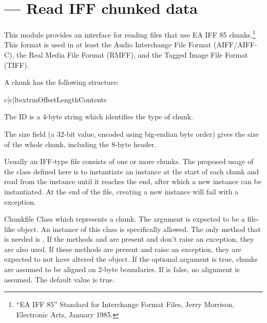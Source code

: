 \section{ ---
	 Read IFF chunked data}




This module provides an interface for reading files that use EA IFF 85
chunks.\footnote{``EA IFF 85'' Standard for Interchange Format Files,
Jerry Morrison, Electronic Arts, January 1985.}  This format is used
in at least the Audio Interchange File Format
(AIFF/AIFF-C), the Real Media File
Format (RMFF), and the
Tagged Image File Format
(TIFF).

A chunk has the following structure:

\begin{tableiii}{c|c|l}{textrm}{Offset}{Length}{Contents}
\end{tableiii}

The ID is a 4-byte string which identifies the type of chunk.

The size field (a 32-bit value, encoded using big-endian byte order)
gives the size of the whole chunk, including the 8-byte header.

Usually an IFF-type file consists of one or more chunks.  The proposed
usage of the  class defined here is to instantiate an
instance at the start of each chunk and read from the instance until
it reaches the end, after which a new instance can be instantiated.
At the end of the file, creating a new instance will fail with a
 exception.

\begin{classdesc}{Chunk}{file}
Class which represents a chunk.  The  argument is expected
to be a file-like object.  An instance of this class is specifically
allowed.  The only method that is needed is .  If the
methods  and  are present and don't
raise an exception, they are also used.  If these methods are present
and raise an exception, they are expected to not have altered the
object.  If the optional argument  is true, chunks are
assumed to be aligned on 2-byte boundaries.  If  is
false, no alignment is assumed.  The default value is true.
\end{classdesc}

